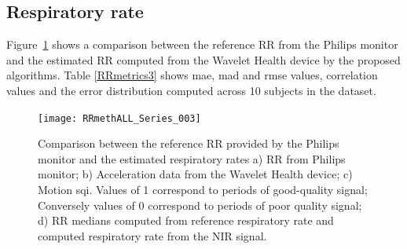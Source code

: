 \subsection{Respiratory rate}

Figure~\ref{RRseries} shows a comparison between the reference RR from the Philips monitor and the estimated RR computed from the Wavelet Health device by the proposed algorithms. Table \ref{RRmetrics3} shows \gls{mae}, \gls{mad} and \gls{rmse} values, correlation values and the error distribution computed across 10 subjects in the dataset. 
 

\begin{figure}[!ht]
	\centering
	\texttt{[image: RRmethALL\_Series\_003]}
	 \caption[Comparison between the reference respiratory rate provided by the Philips monitor and the estimated respiratory rates.]{Comparison between the reference RR provided by the Philips monitor and the estimated respiratory rates a) RR from Philips monitor; b) Acceleration data from the Wavelet Health device; c) Motion \gls{sqi}. Values of 1 correspond to periods of good-quality signal; Conversely values of 0 correspond to periods of poor quality signal; d) RR medians computed from reference respiratory rate and computed respiratory rate from the NIR signal.}
	 \label{RRseries}
\end{figure}
    
